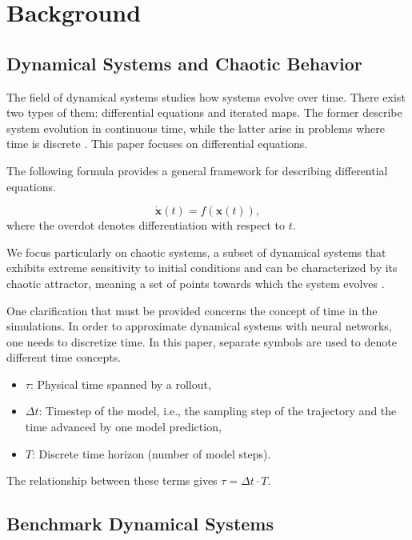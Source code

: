 \documentclass{article}
\begin{document}
\newpage

\section{Background}

\subsection{Dynamical Systems and Chaotic Behavior}

The field of dynamical systems studies how systems evolve over time. There exist two types of them: differential equations and iterated maps. The former describe system evolution in continuous time, while the latter arise in problems where time is discrete \cite{strogatz_nonlinear_1994}. This paper focuses on differential equations.

The following formula provides a general framework for describing differential equations.

\[
\dot{\mathbf{x}}(t) = f(\mathbf{x}(t)),
\]
where the overdot denotes differentiation with respect to $t$.

We focus particularly on chaotic systems, a subset of dynamical systems that exhibits extreme sensitivity to initial conditions and can be characterized by its chaotic attractor, meaning a set of points towards which the system evolves \cite{strogatz_nonlinear_1994}.

One clarification that must be provided concerns the concept of time in the simulations. In order to approximate dynamical systems with neural networks, one needs to discretize time. In this paper, separate symbols are used to denote different time concepts.

\begin{itemize}
    \item $\tau$: Physical time spanned by a rollout,
    \item $\Delta t$: Timestep of the model, i.e., the sampling step of the trajectory and the time advanced by one model prediction,
    \item $T$: Discrete time horizon (number of model steps).
\end{itemize}

The relationship between these terms gives $\tau = \Delta t \cdot T$.

\subsection{Benchmark Dynamical Systems}
\label{sec:dynamical-systems}
\end{document}
